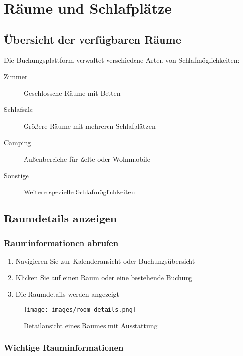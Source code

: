 \section{Räume und Schlafplätze}
\label{sec:raumverwaltung}

\subsection{Übersicht der verfügbaren Räume}

Die Buchungsplattform verwaltet verschiedene Arten von Schlafmöglichkeiten:

\begin{description}
    \item[Zimmer] Geschlossene Räume mit Betten
    \item[Schlafsäle] Größere Räume mit mehreren Schlafplätzen
    \item[Camping] Außenbereiche für Zelte oder Wohnmobile
    \item[Sonstige] Weitere spezielle Schlafmöglichkeiten
\end{description}

\subsection{Raumdetails anzeigen}

\subsubsection{Rauminformationen abrufen}

\begin{enumerate}
    \item Navigieren Sie zur Kalenderansicht oder Buchungsübersicht
    \item Klicken Sie auf einen Raum oder eine bestehende Buchung
    \item Die Raumdetails werden angezeigt
\end{enumerate}

\begin{figure}[H]
    \centering
    \texttt{[image: images/room-details.png]}
    \caption{Detailansicht eines Raumes mit Ausstattung}
    \label{fig:room-details}
\end{figure}

\subsubsection{Wichtige Rauminformationen}

